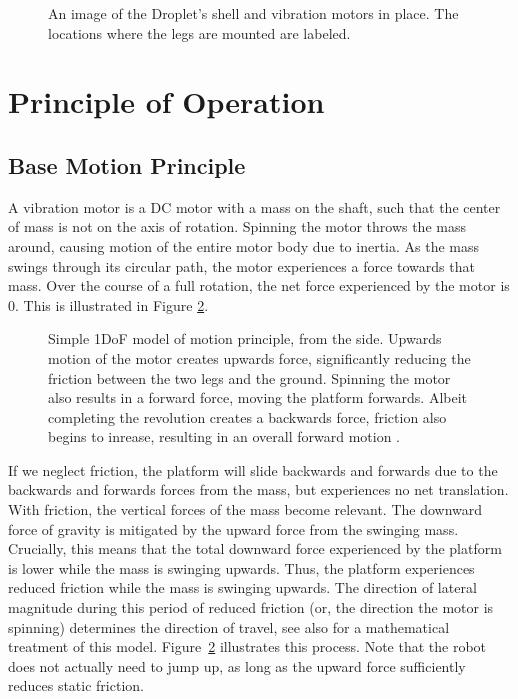 \documentclass[letterpaper, 10pt, conference]{ieeeconf}
\begin{document}
\begin{figure}[h]
	\centering
	
	\caption{An image of the Droplet's shell and vibration motors in place. The locations where the legs are mounted are labeled.}
	\label{motorLocations}
\end{figure}



\section{Principle of Operation}

\subsection{Base Motion Principle}
A vibration motor is a DC motor with a mass on the shaft, such that the center of mass is not on the axis of rotation. Spinning the motor throws the mass around, causing motion of the entire motor body due to inertia. As the mass swings through its circular path, the motor experiences a force towards that mass. Over the course of a full rotation, the net force experienced by the motor is 0. This is illustrated in Figure \ref{motorDiagram}.

\begin{figure}
\centering

\caption{Simple 1DoF model of motion principle, from the side. Upwards motion of the motor creates upwards force, significantly reducing the friction between the two legs and the ground. Spinning the motor also results in a forward force, moving the platform forwards. Albeit completing the revolution creates a backwards force, friction also begins to inrease, resulting in an overall forward motion \cite{Vartholomeos2005}.}
\label{motorDiagram}
\end{figure}

If we neglect friction, the platform will slide backwards and forwards due to the backwards and forwards forces from the mass, but experiences no net translation. With friction, the vertical forces of the mass become relevant. The downward force of gravity is mitigated by the upward force from the swinging mass. Crucially, this means that the total downward force experienced by the platform is lower while the mass is swinging upwards. Thus, the platform experiences reduced friction while the mass is swinging upwards. The direction of lateral magnitude during this period of reduced friction (or, the direction the motor is spinning) determines the direction of travel, see also \cite{Vartholomeos2005,Vartholomeos2006} for a mathematical treatment of this model. Figure~\ref{motorDiagram} illustrates this process. Note that the robot does not actually need to jump up, as long as the upward force sufficiently reduces static friction. 
\end{document}
